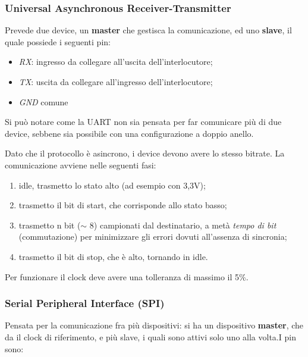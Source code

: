 \documentclass[
]{book}
\providecommand{\tightlist}{%
  \setlength{\itemsep}{0pt}\setlength{\parskip}{0pt}}
\begin{document}
\subsubsection{Universal Asynchronous
Receiver-Transmitter}\label{universal-asynchronous-receiver-transmitter}

Prevede due device, un \textbf{master} che gestisca la comunicazione, ed
uno \textbf{slave}, il quale possiede i seguenti pin:

\begin{itemize}
\tightlist
\item
  \emph{RX}: ingresso da collegare all'uscita dell'interlocutore;
\item
  \emph{TX}: uscita da collegare all'ingresso dell'interlocutore;
\item
  \emph{GND} comune
\end{itemize}

Si può notare come la UART non sia pensata per far comunicare più di due
device, sebbene sia possibile con una configurazione a doppio anello.

Dato che il protocollo è asincrono, i device devono avere lo stesso
bitrate. La comunicazione avviene nelle seguenti fasi:

\begin{enumerate}
\def\labelenumi{\arabic{enumi})}
\setcounter{enumi}{-1}
\tightlist
\item
  idle, trasmetto lo stato alto (ad esempio con 3,3V);
\item
  trasmetto il bit di start, che corrisponde allo stato basso;
\item
  trasmetto n bit (\(\sim\) 8) campionati dal destinatario, a metà
  \emph{tempo di bit} (commutazione) per minimizzare gli errori dovuti
  all'assenza di sincronia;
\item
  trasmetto il bit di stop, che è alto, tornando in idle.
\end{enumerate}

Per funzionare il clock deve avere una tolleranza di massimo il 5\%.

\subsubsection{Serial Peripheral Interface
(SPI)}\label{serial-peripheral-interface-spi}

Pensata per la comunicazione fra più dispositivi: si ha un dispositivo
\textbf{master}, che da il clock di riferimento, e più slave, i quali
sono attivi solo uno alla volta.\newline I pin sono:
\end{document}
